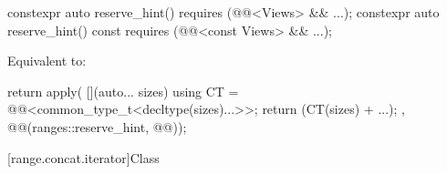 %
\begin{itemdecl}
constexpr auto reserve_hint() requires (@@<Views> && ...);
constexpr auto reserve_hint() const requires (@@<const Views> && ...);
\end{itemdecl}

\begin{itemdescr}
\pnum
\effects
Equivalent to:
\begin{codeblock}
return apply(
  [](auto... sizes) {
    using CT = @@<common_type_t<decltype(sizes)...>>;
    return (CT(sizes) + ...);
  },
  @@(ranges::reserve_hint, @@));
\end{codeblock}
\end{itemdescr}

[range.concat.iterator]{Class }

